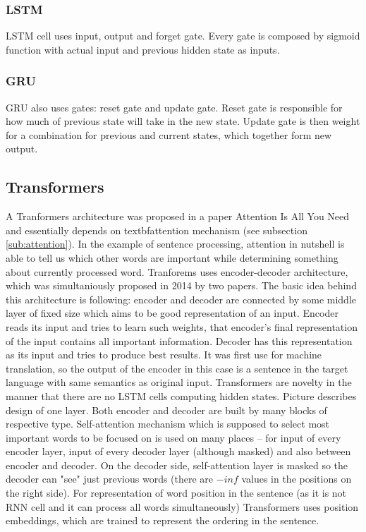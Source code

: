 \subsubsection*{LSTM} LSTM cell uses input, output and forget gate. Every gate is composed by sigmoid function with actual input and previous hidden state as inputs. %
\subsubsection*{GRU}
GRU also uses gates: reset gate and update gate. %
Reset gate is responsible for how much of previous state will take in the new state. Update gate is then weight for a combination for previous and current states, which together form new output.

\subsection{Transformers}
A Tranformers architecture was proposed in a paper Attention Is All You Need %
and essentially depends on textbf{attention} mechanism (see subsection \ref{sub:attention}). In the example of sentence processing, attention in nutshell is able to tell us which other words are important while determining something about currently processed word.
Tranforems uses encoder-decoder architecture, which was simultaniously proposed in 2014 by two papers. The basic idea behind this architecture is following: encoder and decoder are connected by some middle layer of fixed size which aims to be good representation of an input. Encoder reads its input and tries to learn such weights, that encoder's final representation of the input contains all important information. Decoder has this representation as its input and tries to produce best results. It was first use for machine translation, so the output of the encoder in this case is a sentence in the target language with same semantics as original input. %
Transformers are novelty in the manner that there are no LSTM cells computing hidden states.%
Picture %
describes design of one layer. Both encoder and decoder are built by many blocks of respective type. Self-attention mechanism which is supposed to select most important words to be focused on is used on many places -- for input of every encoder layer, input of every decoder layer (although masked) and also between encoder and decoder. On the decoder side, self-attention layer is masked so the decoder can "see" just previous words (there are $-inf$ values in the positions on the right side). For representation of word position in the sentence (as it is not RNN cell and it can process all words simultaneously) Transformers uses position embeddings, which are trained to represent the ordering in the sentence.



